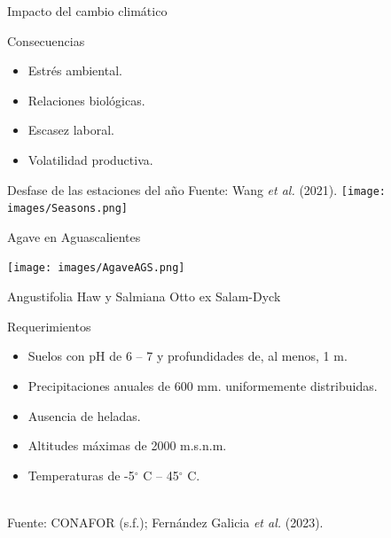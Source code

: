 \documentclass[aspectratio=169]{beamer}
\begin{document}
\begin{frame}{Impacto del cambio climático}
\vspace{-1cm}

\begin{block}{\centering Consecuencias}
       \begin{minipage}{0.5\textwidth}
			\begin{itemize}
				\item Estrés ambiental.
                \item Relaciones biológicas.
			\end{itemize}
		\end{minipage}%
		\begin{minipage}{0.5\textwidth}
			\begin{itemize}
				\item Escasez laboral.
                \item Volatilidad productiva.
			\end{itemize}
		\end{minipage}
    \end{block}
    \pause
    \begin{block}{Desfase de las estaciones del año \hfill {\scriptsize Fuente: Wang \textit{et al.} (2021).}}
    \centering
        \texttt{[image: images/Seasons.png]}
    \end{block}
\end{frame}




\begin{frame}{Agave en Aguascalientes}
    \vspace{-1cm}
    \begin{minipage}{0.5\textwidth}
			\hspace{-0.5cm}\texttt{[image: images/AgaveAGS.png]}
		\end{minipage}%
		\begin{minipage}{0.5\textwidth}
			\begin{block}{Angustifolia Haw y Salmiana Otto ex Salam-Dyck}
			\end{block}
            \pause\begin{block}{Requerimientos}
                \begin{itemize}
				\item Suelos con pH de 6 -- 7 y profundidades de, al menos, 1 m.
                    \item Precipitaciones anuales de 600 mm. uniformemente distribuidas.
                    \item Ausencia de heladas.
                    \item Altitudes máximas de 2000 m.s.n.m.
                    \item Temperaturas de -5$^\circ$ C -- 45$^\circ$ C. 
			\end{itemize}
            \end{block}
		\end{minipage}
        \,\\
        \hfill {\scriptsize Fuente: CONAFOR (s.f.);  Fernández Galicia \textit{et al.} (2023).}
\end{frame}
\end{document}
